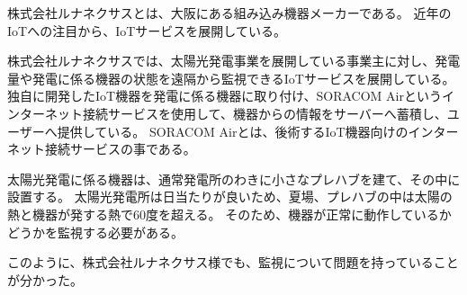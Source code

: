 
\begin{comment}
また、IoTサービスを開発しているルナネクサスさんへ聞き取りを行った。
・ルナネクサスさんの説明
・ルナネクサスさんが開発しているサービスの説明
・どのような点で困っているのか、等の聞き取り結果
\end{comment}

株式会社ルナネクサスとは、大阪にある組み込み機器メーカーである。
近年のIoTへの注目から、IoTサービスを展開している。


株式会社ルナネクサスでは、太陽光発電事業を展開している事業主に対し、発電量や発電に係る機器の状態を遠隔から監視できるIoTサービスを展開している。
独自に開発したIoT機器を発電に係る機器に取り付け、SORACOM Airというインターネット接続サービスを使用して、機器からの情報をサーバーへ蓄積し、ユーザーへ提供している。
SORACOM Airとは、後術するIoT機器向けのインターネット接続サービスの事である。

太陽光発電に係る機器は、通常発電所のわきに小さなプレハブを建て、その中に設置する。
太陽光発電所は日当たりが良いため、夏場、プレハブの中は太陽の熱と機器が発する熱で60度を超える。
そのため、機器が正常に動作しているかどうかを監視する必要がある。

このように、株式会社ルナネクサス様でも、監視について問題を持っていることが分かった。

